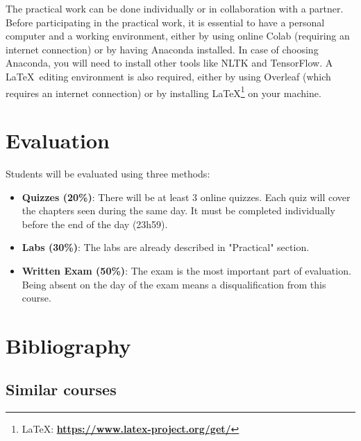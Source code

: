 \documentclass[11pt, a4paper]{article}
\newcommand{\kurl}[1]{{\scriptsize\bfseries\url{#1}}}
\begin{document}
The practical work can be done individually or in collaboration with a partner. Before participating in the practical work, it is essential to have a personal computer and a working environment, either by using online Colab (requiring an internet connection) or by having Anaconda installed.
In case of choosing Anaconda, you will need to install other tools like NLTK and TensorFlow. A \LaTeX\ editing environment is also required, either by using Overleaf (which requires an internet connection) or by installing \LaTeX\footnote{\LaTeX: \kurl{https://www.latex-project.org/get/}} on your machine.

\section{Evaluation}

Students will be evaluated using three methods:
\begin{itemize}
	\item \textbf{Quizzes (20\%)}: There will be at least 3 online quizzes. 
	Each quiz will cover the chapters seen during the same day.
	It must be completed individually before the end of the day (23h59).
	\item \textbf{Labs (30\%)}: The labs are already described in "Practical" section.
	\item \textbf{Written Exam (50\%)}: The exam is the most important part of evaluation. 
	Being absent on the day of the exam means a disqualification from this course.
\end{itemize}

\section{Bibliography}

\subsection{Similar courses}
\end{document}
